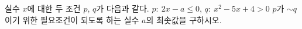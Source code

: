 실수 $x$에 대한 두 조건 $p$, $q$가 다음과 같다. $p:\ 2x-a\le 0$, $q:\ x^2-5x+4>0$ $p$가 $\sim q$이기 위한 필요조건이 되도록 하는 실수 $a$의 최솟값을 구하시오.
